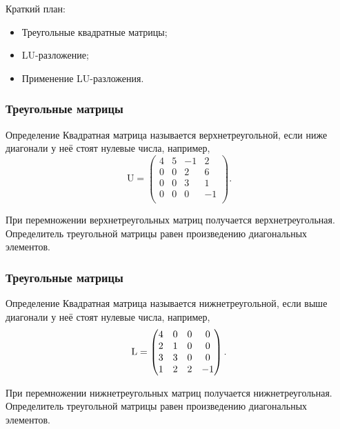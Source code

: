 
\begin{frame} %


\end{frame}



\begin{frame}{Краткий план:}
  \begin{itemize}[<+->]
    \item Треугольные квадратные матрицы;
    \item LU-разложение;
    \item Применение LU-разложения.
  \end{itemize}

\end{frame}



\begin{frame}
    \frametitle{Треугольные матрицы}

    \begin{block}{Определение}
        Квадратная матрица называется \alert{верхнетреугольной},
        если ниже диагонали у неё стоят нулевые числа, например,
        \[
            \mathrm{U} = 
        \begin{pmatrix}
            4 & 5 & -1 & 2 \\
            0 & 0 & 2 & 6 \\
            0 & 0 & 3 & 1 \\
            0 & 0 & 0 & -1 \\
        \end{pmatrix}.    
        \]
    \end{block}
\pause
При перемножении верхнетреугольных матриц получается верхнетреугольная.
\pause
Определитель треугольной матрицы равен произведению диагональных элементов.

\end{frame}


\begin{frame}
\frametitle{Треугольные матрицы}

    \begin{block}{Определение}
        Квадратная матрица называется \alert{нижнетреугольной},
        если выше диагонали у неё стоят нулевые числа, например,
        \[
            \operatorname{L} =
        \begin{pmatrix}
            4 & 0 & 0 & 0 \\
            2 & 1 & 0 & 0 \\
            3 & 3 & 0 & 0 \\
            1 & 2 & 2 & -1 \\
        \end{pmatrix}.    
        \]
    \end{block}
    \pause
    При перемножении нижнетреугольных матриц получается нижнетреугольная.
    \pause
    Определитель треугольной матрицы равен произведению диагональных элементов.

\end{frame}




